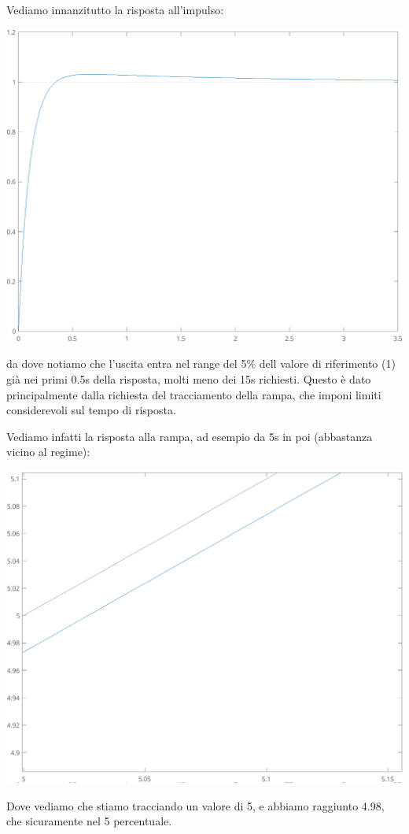 \documentclass[a4paper,11pt]{article}
\begin{document}
\noindent
\begin{minipage}{\textwidth}

Vediamo innanzitutto la risposta all'impulso:
\begin{center}
	\includegraphics[scale=1]{../figures/crociera_control_step.png}
\end{center}
da dove notiamo che l'uscita entra nel range del 5\% dell valore di riferimento (1) già nei primi 0.5s della risposta, molti meno dei 15s richiesti.
Questo è dato principalmente dalla richiesta del tracciamento della rampa, che imponi limiti considerevoli sul tempo di risposta.

Vediamo infatti la risposta alla rampa, ad esempio da 5s in poi (abbastanza vicino al regime): 
\begin{center}
	\includegraphics[scale=1]{../figures/crociera_control_ramp.png}
\end{center}
Dove vediamo che stiamo tracciando un valore di 5, e abbiamo raggiunto 4.98, che sicuramente nel 5 percentuale.

\end{minipage}
\end{document}
